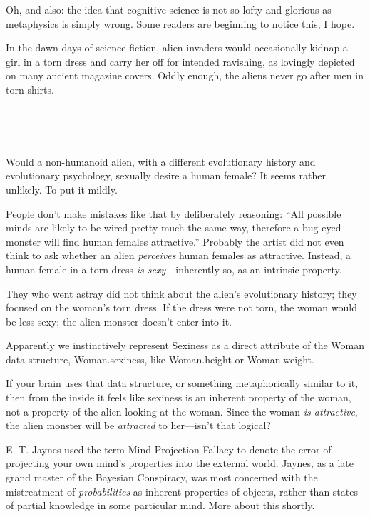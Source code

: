 {
 Oh, and also: the idea that cognitive science is not so lofty and
glorious as metaphysics is simply wrong. Some readers are beginning to
notice this, I hope.}

\myendsectiontext


{
 In the dawn days of science fiction, alien invaders would
occasionally kidnap a girl in a torn dress and carry her off for
intended ravishing, as lovingly depicted on many ancient magazine
covers. Oddly enough, the aliens never go after men in torn shirts.}

{
 ~}

{\centering
{}
 
\par}


\bigskip

{
 ~}

{
 Would a non-humanoid alien, with a different evolutionary history
and evolutionary psychology, sexually desire a human female? It seems
rather unlikely. To put it mildly.}

{
 People don't make mistakes like that by
deliberately reasoning: ``All possible minds are
likely to be wired pretty much the same way, therefore a bug-eyed
monster will find human females attractive.''
Probably the artist did not even think to ask whether an alien
\textit{perceives} human females as attractive. Instead, a human female
in a torn dress \textit{is sexy}{}---inherently so, as an intrinsic
property.}

{
 They who went astray did not think about the
alien's evolutionary history; they focused on the
woman's torn dress. If the dress were not torn, the
woman would be less sexy; the alien monster doesn't
enter into it.}

{
 Apparently we instinctively represent Sexiness as a direct
attribute of the Woman data structure, Woman.sexiness, like
Woman.height or Woman.weight.}

{
 If your brain uses that data structure, or something
metaphorically similar to it, then from the inside it feels like
sexiness is an inherent property of the woman, not a property of the
alien looking at the woman. Since the woman \textit{is attractive}, the
alien monster will be \textit{attracted} to her---isn't
that logical?}

{
 E. T. Jaynes used the term Mind Projection Fallacy to denote the
error of projecting your own mind's properties into the
external world. Jaynes, as a late grand master of the Bayesian
Conspiracy, was most concerned with the mistreatment of
\textit{probabilities} as inherent properties of objects, rather than
states of partial knowledge in some particular mind. More about this
shortly.}

